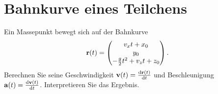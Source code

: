 \documentclass{scrartcl}
\begin{document}
\section{Bahnkurve eines Teilchens}
\label{sec:bahnkurve_eines_teilchens}

Ein Massepunkt bewegt sich auf der Bahnkurve
\[
  \mathbf{r}(t) = \begin{pmatrix}v_x t + x_0 \\ y_0 \\ -\frac{g}{2} t^2 + v_z t + z_0\end{pmatrix}.
\]
Berechnen Sie seine Geschwindigkeit $\mathbf{v}(t) = \frac{\mathrm{d} \mathbf{r}(t)}{\mathrm{d} t}$ und Beschleunigung $\mathbf{a}(t) = \frac{\mathrm{d} \mathbf{v}(t)}{\mathrm{d} t}$.
Interpretieren Sie das Ergebnis.
\end{document}
